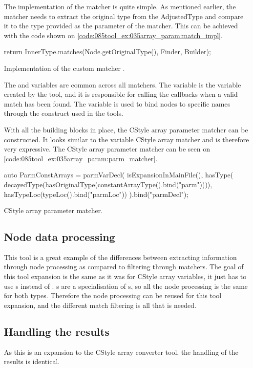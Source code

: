 The implementation of the matcher is quite simple. As mentioned earlier, the matcher needs to extract the original type from the AdjustedType and compare it to the type provided as the parameter of the matcher. This can be achieved with the code shown on \cref{code:085tool_ex:035array_param:match_impl}.

\begin{listing}[H]
    \begin{cppcode}
return InnerType.matches(Node.getOriginalType(), Finder, Builder);
    \end{cppcode}
    \caption{Implementation of the custom matcher .}
    \label{code:085tool_ex:035array_param:match_impl}
\end{listing}

The  and  variables are common across all matchers. The  variable is the  variable created by the tool, and it is responsible for calling the callbacks when a valid match has been found. The  variable is used to bind nodes to specific names through the  construct used in the tools.

With all the building blocks in place, the CStyle array parameter matcher can be constructed. It looks similar to the variable CStyle array matcher and is therefore very expressive. The CStyle array parameter matcher can be seen on \cref{code:085tool_ex:035array_param:parm_matcher}.

\begin{listing}[H]
    \begin{cppcode}
auto ParmConstArrays = parmVarDecl(
        isExpansionInMainFile(),
        hasType(
            decayedType(hasOriginalType(constantArrayType().bind("parm")))),
        hasTypeLoc(typeLoc().bind("parmLoc")) 
    ).bind("parmDecl");
    \end{cppcode}
    \caption{CStyle array parameter matcher.}
    \label{code:085tool_ex:035array_param:parm_matcher}
\end{listing}

\subsection{Node data processing}

This tool is a great example of the differences between extracting information through node processing as compared to filtering through matchers. The goal of this tool expansion is the same as it was for CStyle array variables, it just has to use s instead of . s are a specialisation of s, so all the node processing is the same for both types. Therefore the node processing can be reused for this tool expansion, and the different match filtering is all that is needed.

\subsection{Handling the results}

As this is an expansion to the CStyle array converter tool, the handling of the results is identical.